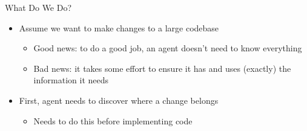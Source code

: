 \documentclass[
ps,
]{prosper}
\begin{document}
    
\begin{slide}{What Do We Do?}

\begin{itemize}

\item Assume we want to make changes to a large codebase

  \begin{itemize}
    
  \item Good news: to do a good job, an agent doesn't need to know everything

  \item Bad news: it takes some effort to ensure it has and uses (exactly) the
    information it needs
    
  \end{itemize}

\item First, agent needs to discover where a change belongs

  \begin{itemize}
    
  \item Needs to do this before implementing code
    
  \end{itemize}

\end{itemize}
  
\end{slide}
\end{document}

